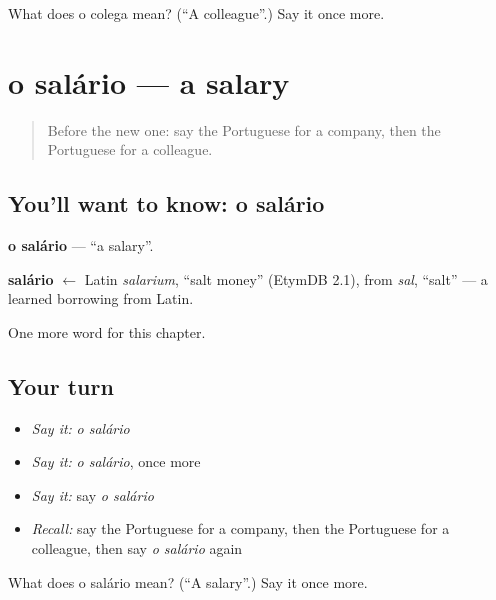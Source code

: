 \begin{tcolorbox}[breakable,colback=teal!4,colframe=teal!35!black,title={Before you move on}]
What does o colega mean? (\textquotedblleft{}A colleague\textquotedblright{}.) Say it once more.
\end{tcolorbox}
\section[o salário]{o salário — a salary}

\label{lesson:PT-C170-salario}



\begin{quote}
Before the new one: say the Portuguese for a company, then the Portuguese for a colleague.
\end{quote}

\subsection*{You'll want to know: o salário}
\textbf{o salário} — \textquotedblleft{}a salary\textquotedblright{}.

\begin{cousinweb}
\textbf{salário} $\leftarrow$ Latin \emph{salarium}, \textquotedblleft{}salt money\textquotedblright{} (EtymDB 2.1), from \emph{sal}, \textquotedblleft{}salt\textquotedblright{} — a learned borrowing from Latin.
\end{cousinweb}

\begin{grammarlens}[title={What you've built}]
One more word for this chapter.
\end{grammarlens}

\subsection*{Your turn}
\begin{itemize}
\raggedright
  \item \emph{Say it:} \emph{o salário}
  \item \emph{Say it:} \emph{o salário}, once more
  \item \emph{Say it:} say \emph{o salário}
  \item \emph{Recall:} say the Portuguese for a company, then the Portuguese for a colleague, then say \emph{o salário} again
\end{itemize}

\begin{tcolorbox}[breakable,colback=teal!4,colframe=teal!35!black,title={Before you move on}]
What does o salário mean? (\textquotedblleft{}A salary\textquotedblright{}.) Say it once more.
\end{tcolorbox}
